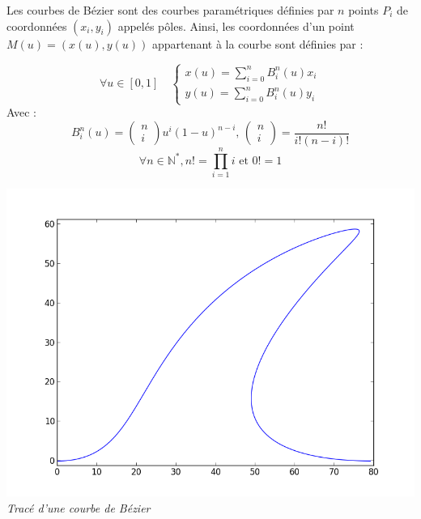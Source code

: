 \documentclass[10pt]{article}
\newif\ifxp
\begin{document}
\ifxp

\else

\fi



Les courbes de Bézier sont des courbes paramétriques définies par $n$ points $P_i$ de coordonnées $\left(x_i,y_i\right)$ appelés pôles. Ainsi, les coordonnées d'un point $M(u)=\left(x(u),y(u)\right)$ appartenant à la courbe sont définies par : 

\begin{minipage}[c]{.45\linewidth}

$$
\forall u \in [0,1] \quad 
\left\{
\begin{array}{l}
x(u)=\sum\limits_{i=0}^{n}B_i^n(u)x_i\\
y(u)=\sum\limits_{i=0}^{n}B_i^n(u)y_i
\end{array}
\right.
$$
Avec :
$$
B_i^n(u)=\left(
\begin{array}{c}
n\\
i
\end{array}\right)u^i\left(1-u \right)^{n-i}
\text{, }
\left(
\begin{array}{c}
n\\
i
\end{array}\right)=\dfrac{n!}{i!(n-i)!}$$
$$
 \forall n\in\mathbb{N^*}, n!=\prod\limits_{i=1}^{n}i \text{ et } 0!=1
 $$


\end{minipage} \hfill
\begin{minipage}[c]{.45\linewidth}
\begin{center}
\includegraphics[width=.9\textwidth]{images/shark.png}
\textit{Tracé d'une courbe de Bézier}
\end{center}
\end{minipage}
\end{document}
